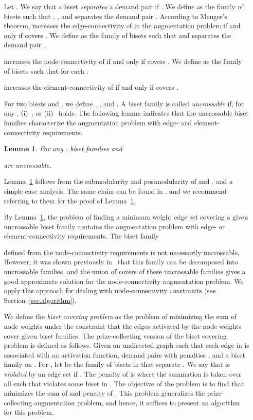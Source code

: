 \documentclass[11pt]{article}
\newtheorem{lemma}{Lemma}
\begin{document}
Let .
We say that a biset  {\em separates} a demand pair  if 
.
We define  as the family of bisets  such that
, , and  separates 
the demand pair .
According to Menger's theorem,  
increases the edge-connectivity of  in the augmentation problem
if and only if 
 covers .
We define  as the family of bisets  such that
 and  separates the demand pair .
 
increases the node-connectivity of  
if and only if 
 covers .
We define  as the family of bisets  such that
 for each .
 
increases the element-connectivity of  
if and only if 
 covers .

For two bisets  and , we define
, 
, 
and 
.
A biset family  is called {\em uncrossable}
if, for any , 
(i)~, or 
(ii)~ holds.
The following lemma indicates that the uncrossable biset families characterize
the augmentation problem with edge- and element-connectivity requirements.



\begin{lemma}\label{lem.edge-element}
For any ,
biset families
 and

are uncrossable.
\end{lemma}

Lemma~\ref{lem.edge-element} follows from the submodularity and
posimodularity of  and , and a simple case analysis.
The same claim can be found in
\cite{FleischerJW06,Nutov12uncrossable}, and we recommend referring to
them for the proof of Lemma~\ref{lem.edge-element}.


By Lemma~\ref{lem.edge-element},
the problem of finding a minimum weight edge set covering 
a given uncrossable biset family
contains the augmentation problem with edge- or element-connectivity
requirements. The biset family

defined from the node-connectivity requirements is not
necessarily uncrossable. However, it was shown previously in~\cite{ChuzhoyK12,Nutov12uncrossable,Nutov12subset}
that this family can be decomposed into uncrossable families, and the union of
covers of these uncrossable families gives a good approximate solution
for the node-connectivity augmentation problem.
We apply this approach for dealing with node-connectivity constraints
(see Section~\ref{sec.algorithm}).

We define the {\em biset covering problem}
as 
the problem of 
minimizing the sum of node weights under the constraint that the edges
activated by the node weights cover given biset families.
The prize-collecting version of the biset covering problem
is defined as follows.
Given an undirected graph  such that each edge in  is
associated with an activation function, 
demand pairs
 with penalties
,
and a biset family  on .
For , let  be the family of bisets in 
that separate .
We say that  is {\em violated} by an edge set 
if .
The penalty of  is  where the summation is
taken over all  such that  violates some biset in .
The objective of the problem is to find  that minimizes 
the sum of  and penalty of .
This problem generalizes
the prize-collecting augmentation problem,
and hence, it suffices to present an algorithm for this problem.
\end{document}
